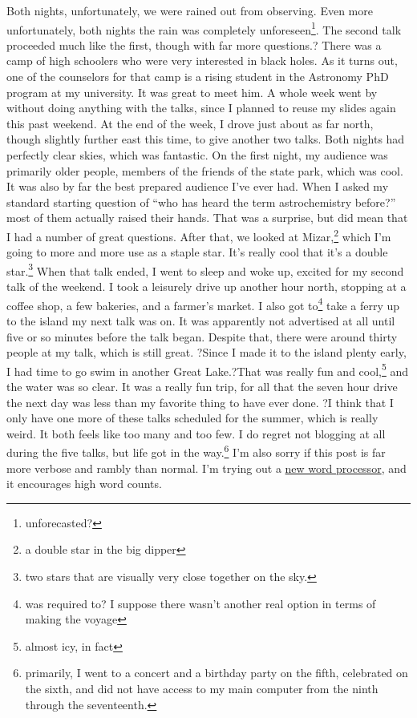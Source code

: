 \documentclass[12pt]{article}[titlepage]
\newcommand{\say}[1]{``#1''}
\newcommand{\1}{\={a}}
\newcommand{\2}{\={e}}
\newcommand{\3}{\={\i}}
\newcommand{\4}{\=o}
\newcommand{\5}{\=u}
\newcommand{\6}{\={A}}
\renewcommand{\,}{\textsuperscript{,}}
\begin{document}
Both nights, unfortunately, we were rained out from observing.
Even more unfortunately, both nights the rain was completely unforeseen\footnote{unforecasted?}.
The second talk proceeded much like the first, though with far more questions.?
There was a camp of high schoolers who were very interested in black holes.
As it turns out, one of the counselors for that camp is a rising student in the Astronomy PhD program at my university.
It was great to meet him.
A whole week went by without doing anything with the talks, since I planned to reuse my slides again this past weekend.
At the end of the week, I drove just about as far north, though slightly further east this time, to give another two talks.
Both nights had perfectly clear skies, which was fantastic.
On the first night, my audience was primarily older people, members of the friends of the state park, which was cool.
It was also by far the best prepared audience I've ever had.
When I asked my standard starting question of \say{who has heard the term astrochemistry before?} most of them actually raised their hands.
That was a surprise, but did mean that I had a number of great questions.
After that, we looked at Mizar,\footnote{a double star in the big dipper} which I'm going to more and more use as a staple star.
It's really cool that it's a double star.\footnote{two stars that are visually very close together on the sky.}
When that talk ended, I went to sleep and woke up, excited for my second talk of the weekend.
I took a leisurely drive up another hour north, stopping at a coffee shop, a few bakeries, and a farmer's market.
I also got to\footnote{was required to? I suppose there wasn't another real option in terms of making the voyage} take a ferry up to the island my next talk was on.
It was apparently not advertised at all until five or so minutes before the talk began.
Despite that, there were around thirty people at my talk, which is still great.
?Since I made it to the island plenty early, I had time to go swim in another Great Lake.?That was really fun and cool,\footnote{almost icy, in fact} and the water was so clear.
It was a really fun trip, for all that the seven hour drive the next day was less than my favorite thing to have ever done.
?I think that I only have one more of these talks scheduled for the summer, which is really weird.
It both feels like too many and too few.
I do regret not blogging at all during the five talks, but life got in the way.\footnote{primarily, I went to a concert and a birthday party on the fifth, celebrated on the sixth, and did not have access to my main computer from the ninth through the seventeenth.}
I'm also sorry if this post is far more verbose and rambly than normal.
I'm trying out a \href{4thewords.com}{new word processor}, and it encourages high word counts.
\end{document}
